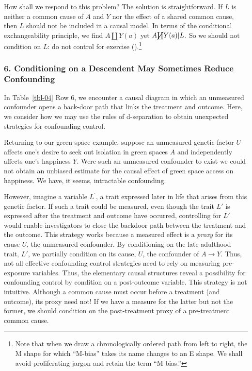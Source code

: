 \documentclass[
  singlecolumn]{article}
\begin{document}
How shall we respond to this problem? The solution is straightforward.
If \(L\) is neither a common cause of \(A\) and \(Y\) nor the effect of
a shared common cause, then \(L\) should not be included in a causal
model. In terms of the conditional exchangeability principle, we find
\(A \coprod Y(a)\) yet \(A \cancel{\coprod} Y(a)| L\). So we should not
condition on \(L\): do not control for exercise
().\footnote{Note that
  when we draw a chronologically ordered path from left to right, the M
  shape for which ``M-bias'' takes its name changes to an E shape. We
  shall avoid proliferating jargon and retain the term ``M bias.''}

\subsubsection{6. Conditioning on a Descendent May Sometimes Reduce
Confounding}\label{section-conditioning-on-descendents}

In Table~\ref{tbl-04} Row 6, we encounter a causal diagram in which an
unmeasured confounder opens a back-door path that links the treatment
and outcome. Here, we consider how we may use the rules of d-separation
to obtain unexpected strategies for confounding control.

Returning to our green space example, suppose an unmeasured genetic
factor \(U\) affects one's desire to seek out isolation in green spaces
\(A\) and independently affects one's happiness \(Y\). Were such an
unmeasured confounder to exist we could not obtain an unbiased estimate
for the causal effect of green space access on happiness. We have, it
seems, intractable confounding.

However, imagine a variable \(L^\prime\), a trait expressed later in
life that arises from this genetic factor. If such a trait could be
measured, even though the trait \(L'\) is expressed after the treatment
and outcome have occurred, controlling for \(L'\) would enable
investigators to close the backdoor path between the treatment and the
outcome. This strategy works because a measured effect is a \emph{proxy}
for its cause \(U\), the unmeasured confounder. By conditioning on the
late-adulthood trait, \(L'\), we partially condition on its cause,
\(U\), the confounder of \(A \to Y\). Thus, not all effective
confounding control strategies need to rely on measuring pre-exposure
variables. Thus, the elementary causal structures reveal a possibility
for confounding control by condition on a post-outcome variable. This
strategy is not intuitive. Although a common cause must occur before a
treatment (and outcome), its proxy need not! If we have a measure for
the latter but not the former, we should condition on the post-treatment
proxy of a pre-treatment common cause.
\end{document}
